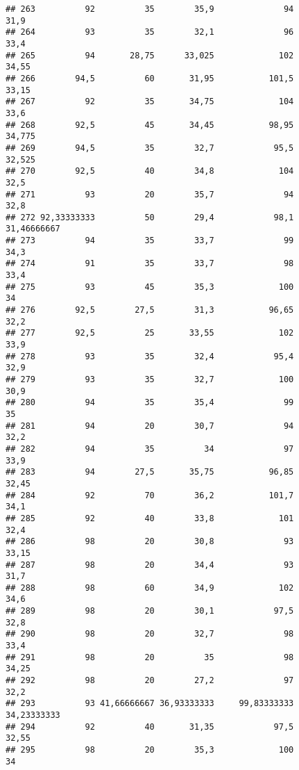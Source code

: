 \documentclass[
]{article}
\begin{document}
\begin{verbatim}
## 263          92          35        35,9              94                 31,9
## 264          93          35        32,1              96                 33,4
## 265          94       28,75      33,025             102                34,55
## 266        94,5          60       31,95           101,5                33,15
## 267          92          35       34,75             104                 33,6
## 268        92,5          45       34,45           98,95               34,775
## 269        94,5          35        32,7            95,5               32,525
## 270        92,5          40        34,8             104                 32,5
## 271          93          20        35,7              94                 32,8
## 272 92,33333333          50        29,4            98,1          31,46666667
## 273          94          35        33,7              99                 34,3
## 274          91          35        33,7              98                 33,4
## 275          93          45        35,3             100                   34
## 276        92,5        27,5        31,3           96,65                 32,2
## 277        92,5          25       33,55             102                 33,9
## 278          93          35        32,4            95,4                 32,9
## 279          93          35        32,7             100                 30,9
## 280          94          35        35,4              99                   35
## 281          94          20        30,7              94                 32,2
## 282          94          35          34              97                 33,9
## 283          94        27,5       35,75           96,85                32,45
## 284          92          70        36,2           101,7                 34,1
## 285          92          40        33,8             101                 32,4
## 286          98          20        30,8              93                33,15
## 287          98          20        34,4              93                 31,7
## 288          98          60        34,9             102                 34,6
## 289          98          20        30,1            97,5                 32,8
## 290          98          20        32,7              98                 33,4
## 291          98          20          35              98                34,25
## 292          98          20        27,2              97                 32,2
## 293          93 41,66666667 36,93333333     99,83333333          34,23333333
## 294          92          40       31,35            97,5                32,55
## 295          98          20        35,3             100                   34

\end{verbatim}
\end{document}

